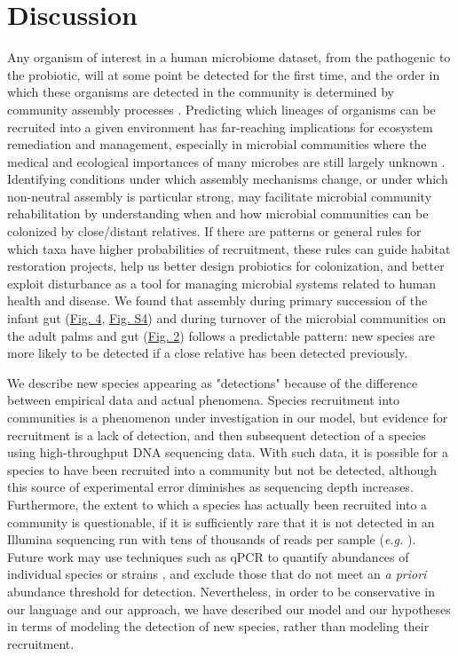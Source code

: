 \documentclass{article}
\begin{document}
\section{Discussion}
Any organism of interest in a human microbiome dataset, from the pathogenic to the probiotic, will at some point be detected for the first time, and the order in which these organisms are detected 
in the community is determined by community assembly processes \cite{Nemergut2013}. Predicting which lineages of organisms can be recruited into a given environment has far-reaching implications for ecosystem remediation and management, especially in microbial communities where the medical and ecological importances of many microbes are still largely unknown \cite{Martiny2015,Vazquez-Baeza2018}. Identifying conditions under which assembly mechanisms change, or under which non-neutral assembly is particular strong, may facilitate microbial community rehabilitation by understanding when and how microbial communities can be colonized by close/distant relatives. If there are patterns or general rules for which taxa have higher probabilities of recruitment, these rules can guide habitat restoration projects, help us better design probiotics for colonization, and better exploit disturbance as a tool for managing microbial systems related to human health and disease. We found that assembly during primary succession of the infant gut (\hyperref[sec:figure4]{Fig. 4}, \hyperref[sec:figureS4]{Fig. S4}) and during turnover of the microbial communities on the adult palms and gut (\hyperref[sec:figure2]{Fig. 2}) follows a predictable pattern: new species are more likely to be detected if a close relative has been detected previously.
\par
We describe new species appearing as "detections" because of the difference between empirical data and actual phenomena. Species recruitment into communities is a phenomenon under investigation in our model, but evidence for recruitment is a lack of detection, and then subsequent detection of a species using high-throughput DNA sequencing data. With such data, it is possible for a species to have been recruited into a community but not be detected, although this source of experimental error diminishes as sequencing depth increases. Furthermore, the extent to which a species has actually been recruited into a community is questionable, if it is sufficiently rare that it is not detected in an Illumina sequencing run with tens of thousands of reads per sample (\emph{e.g.} \cite{Yassour2016}). Future work may use techniques such as qPCR to quantify abundances of individual species or strains \cite{Williamson761486}, and exclude those that do not meet an \emph{a priori} abundance threshold for detection. Nevertheless, in order to be conservative in our language and our approach, we have described our model and our hypotheses in terms of modeling the detection of new species, rather than modeling their recruitment.
\end{document}
